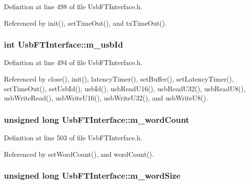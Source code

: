 Definition at line 498 of file UsbFTInterface.h.

Referenced by init(), setTimeOut(), and txTimeOut().\hypertarget{classUsbFTInterface_a91df5c0547e8be460bc087e27afe05aa}{
\subsubsection[{m\_\-usbId}]{\setlength{\rightskip}{0pt plus 5cm}int {\bf UsbFTInterface::m\_\-usbId}}}
\label{classUsbFTInterface_a91df5c0547e8be460bc087e27afe05aa}


Definition at line 494 of file UsbFTInterface.h.

Referenced by close(), init(), latencyTimer(), setBuffer(), setLatencyTimer(), setTimeOut(), setUsbId(), usbId(), usbReadU16(), usbReadU32(), usbReadU8(), usbWriteRead(), usbWriteU16(), usbWriteU32(), and usbWriteU8().\hypertarget{classUsbFTInterface_a91c81850db2579afa6a5296e0bf0dbef}{
\subsubsection[{m\_\-wordCount}]{\setlength{\rightskip}{0pt plus 5cm}unsigned long {\bf UsbFTInterface::m\_\-wordCount}}}
\label{classUsbFTInterface_a91c81850db2579afa6a5296e0bf0dbef}


Definition at line 503 of file UsbFTInterface.h.

Referenced by setWordCount(), and wordCount().\hypertarget{classUsbFTInterface_a05ccc38a60c4b921b835238b604b38d8}{
\subsubsection[{m\_\-wordSize}]{\setlength{\rightskip}{0pt plus 5cm}unsigned long {\bf UsbFTInterface::m\_\-wordSize}}}
\label{classUsbFTInterface_a05ccc38a60c4b921b835238b604b38d8}


